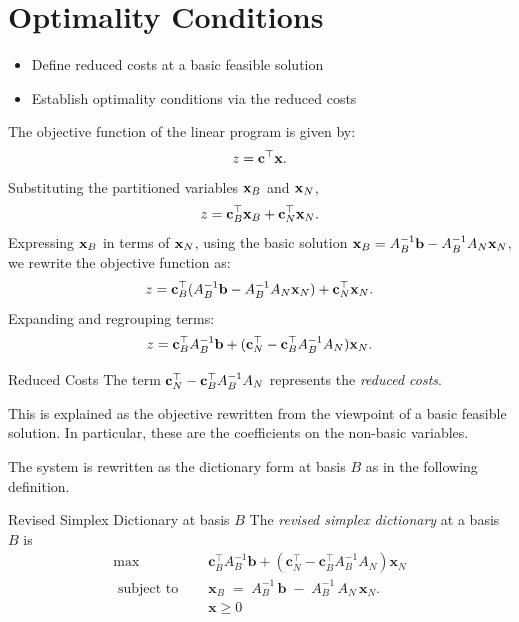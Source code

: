 \section{Optimality Conditions}
\begin{outcome}
\begin{itemize}
\item Define reduced costs at a basic feasible solution
\item Establish optimality conditions via the reduced costs
\end{itemize}
\end{outcome}
The objective function of the linear program is given by:
    \[
    z = \mathbf{c}^\top \mathbf{x}.
    \]
    Substituting the partitioned variables \( \mathbf{x}_B \) and \( \mathbf{x}_N \),
    \[
    z =\mathbf{c}_B^\top \mathbf{x}_B +\mathbf{c}_N^\top \mathbf{x}_N.
    \]
    Expressing \( \mathbf{x}_B \) in terms of \( \mathbf{x}_N \), using the basic solution \( \mathbf{x}_B = A_B^{-1}\mathbf{b}- A_B^{-1} A_N \mathbf{x}_N \), we rewrite the objective function as:
    \begin{equation}
    z =\mathbf{c}_B^\top (A_B^{-1}\mathbf{b}- A_B^{-1} A_N \mathbf{x}_N) +\mathbf{c}_N^\top \mathbf{x}_N.
    \end{equation}
    Expanding and regrouping terms:
    \begin{equation}
    z =\mathbf{c}_B^\top A_B^{-1}\mathbf{b}+  (\mathbf{c}_N^\top -\mathbf{c}_B^\top A_B^{-1} A_N )\mathbf{x}_N.
    \end{equation}
    \begin{definition}{Reduced Costs}{}{}
    The term \(\mathbf{c}_N^\top -\mathbf{c}_B^\top A_B^{-1} A_N \) represents the \emph{reduced costs}.  
    
    This is explained as the objective rewritten from the viewpoint of a basic feasible solution. In particular, these are the coefficients on the non-basic variables.
\end{definition}
    


The system is rewritten as the dictionary form at basis $B$ as in the following definition.

\begin{definition}{Revised Simplex Dictionary at basis $B$}{}{}
The \emph{revised simplex dictionary} at a basis $B$ is 
\begin{equation}
\label{eq:dictionary-general}
\begin{aligned}
\max \quad & \mathbf{c}_B^\top A_B^{-1}\mathbf{b} + (\mathbf{c}_N^\top -  \mathbf{c}_B^\top A_B^{-1}A_N)\mathbf{x}_N\\
\text{ subject to } \quad & 
 \mathbf{x}_B 
\;=\;
A_B^{-1}\,\mathbf{b}
\;-\;
A_B^{-1} \,A_N\,\mathbf{x}_N.\\
& \mathbf{x} \geq 0
\end{aligned}
\end{equation}
\end{definition}


